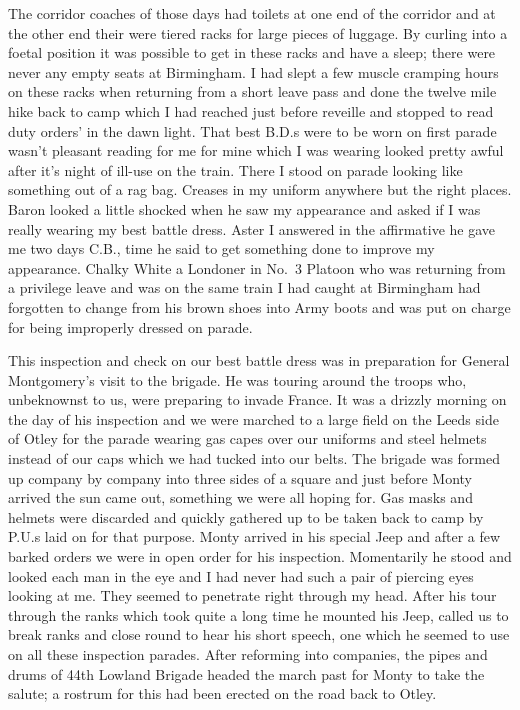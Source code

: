The corridor coaches of those days had toilets at one end of the
corridor and at the other end their were tiered racks for large pieces
of luggage. By curling into a foetal position it was possible to get
in these racks and have a sleep; there were never any empty seats at
Birmingham. I had slept a few muscle cramping hours on these racks
when returning from a short leave pass and done the twelve mile hike
back to camp which I had reached just before reveille and stopped to
read duty orders' in the dawn light. That best B.D.s were to be worn
on first parade wasn't pleasant reading for me for mine which I was
wearing looked pretty awful after it's night of ill-use on the
train. There I stood on parade looking like something out of a rag
bag. Creases in my uniform anywhere but the right places. \Lieutenant Baron
looked a little shocked when he saw my appearance and asked if I was
really wearing my best battle dress. Aster I answered in the
affirmative he gave me two days C.B., time he said to get something
done to improve my appearance. Chalky White a Londoner in No.~3 Platoon
who was returning from a privilege leave and was on the same train I
had caught at Birmingham had forgotten to change from his brown shoes
into Army boots and was put on charge for being improperly dressed on
parade.

This inspection and check on our best battle dress was in preparation
for General Montgomery's visit to the brigade. He was touring around
the troops who, unbeknownst to us, were preparing to invade France. It
was a drizzly morning on the day of his inspection and we were marched
to a large field on the Leeds side of Otley for the parade wearing gas
capes over our uniforms and steel helmets instead of our caps which we
had tucked into our belts. The brigade was formed up company by
company into three sides of a square and just before Monty arrived the
sun came out, something we were all hoping for. Gas masks and helmets
were discarded and quickly gathered up to be taken back to camp by
P.U.s laid on for that purpose. Monty arrived in his special Jeep and
after a few barked orders we were in open order for his
inspection. Momentarily he stood and looked each man in the eye and I
had never had such a pair of piercing eyes looking at me. They seemed
to penetrate right through my head. After his tour through the ranks
which took quite a long time he mounted his Jeep, called us to break
ranks and close round to hear his short speech, one which he seemed to
use on all these inspection parades. After reforming into companies,
the pipes and drums of 44th Lowland Brigade headed the march past for
Monty to take the salute; a rostrum for this had been erected on the
road back to Otley.

